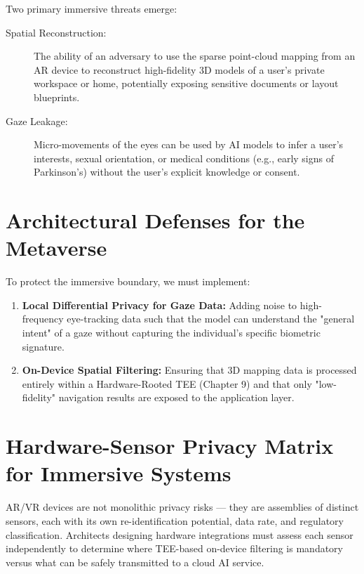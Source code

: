 Two primary immersive threats emerge:

\begin{description}
  \item[Spatial Reconstruction:] 
        The ability of an adversary to use the sparse point-cloud mapping from an AR device to reconstruct high-fidelity 3D models of a user's private workspace or home, potentially exposing sensitive documents or layout blueprints.
  \item[Gaze Leakage:]
        Micro-movements of the eyes can be used by AI models to infer a user's interests, sexual orientation, or medical conditions (e.g., early signs of Parkinson's) without the user's explicit knowledge or consent.
\end{description}

\section{Architectural Defenses for the Metaverse}
\label{sec:metaverse_defenses}

To protect the immersive boundary, we must implement:

\begin{enumerate}
    \item \textbf{Local Differential Privacy for Gaze Data:} Adding noise to high-frequency eye-tracking data such that the model can understand the "general intent" of a gaze without capturing the individual's specific biometric signature.
    \item \textbf{On-Device Spatial Filtering:} Ensuring that 3D mapping data is processed entirely within a Hardware-Rooted TEE (Chapter 9) and that only "low-fidelity" navigation results are exposed to the application layer.
\end{enumerate}

\section{Hardware-Sensor Privacy Matrix for Immersive Systems}
\label{sec:sensor_privacy_matrix}

AR/VR devices are not monolithic privacy risks --- they are assemblies of distinct sensors, each with its own re-identification potential, data rate, and regulatory classification. Architects designing hardware integrations must assess each sensor independently to determine where TEE-based on-device filtering is mandatory versus what can be safely transmitted to a cloud AI service.


